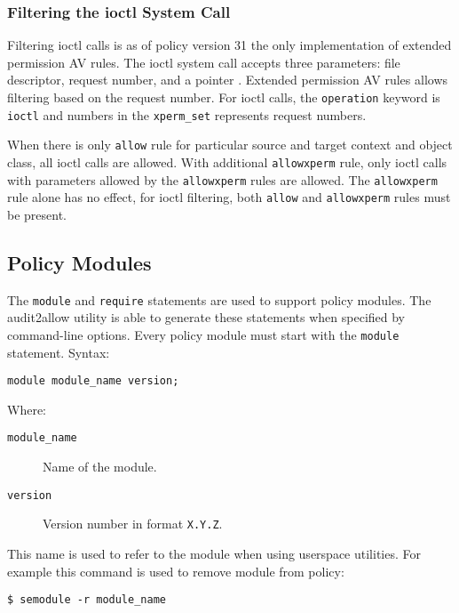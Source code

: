 \subsubsection{Filtering the ioctl System Call}
Filtering ioctl calls is as of policy version 31 the only implementation of
extended permission AV rules. The ioctl system call accepts three parameters:
file descriptor, request number, and a pointer \cite{ioctl}. Extended permission
AV rules allows filtering based on the request number. For ioctl calls, the
\texttt{operation} keyword is \texttt{ioctl} and numbers in the
\texttt{xperm\_set} represents request numbers.

When there is only \texttt{allow} rule for particular source and target context
and object class, all ioctl calls are allowed. With additional
\texttt{allowxperm} rule, only ioctl calls with parameters allowed by the
\texttt{allowxperm} rules are allowed. The \texttt{allowxperm} rule alone has
no effect, for ioctl filtering, both \texttt{allow} and \texttt{allowxperm}
rules must be present.

\subsection{Policy Modules}
\label{modules}

The \texttt{module} and \texttt{require} statements are used to support policy
modules. The audit2allow utility is able to generate these statements when
specified by command-line options. Every policy module must start with the
\texttt{module} statement. Syntax:
\begin{lstlisting}[language=te]
module module_name version;
\end{lstlisting}
Where:
\begin{description}
    \item [\texttt{module\_name}] Name of the module.
    \item [\texttt{version}] Version number in format \texttt{X.Y.Z}.
\end{description}
This name is used to refer to the module when using userspace utilities. For
example this command is used to remove module from policy:
\begin{lstlisting}
$ semodule -r module_name
\end{lstlisting}


